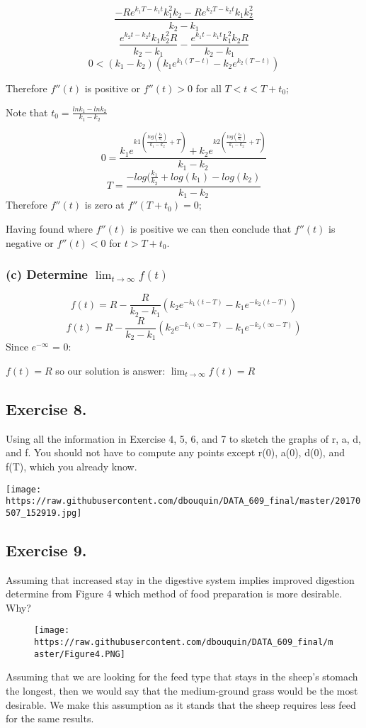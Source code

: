 \documentclass[]{article}
\begin{document}
\[\frac{-R e ^{k_1 T - k_1 t}k_1^2 k_2 - R e^{k_2T -k_2t}k_1 k_2^2}{k_2 - k_1}\]
\[\frac{ e^{k_2 t - k_2 t}k_1 k_2^2 R}{k_2 - k_1} - \frac{ e^{k_1 t - k_1 t}k_1^2 k_2 R}{k_2 - k_1}\]
\[0 < (k_1 - k_2)(k_1 e^{k_1(T-t)}- k_2 e^{k_2(T-t)})\]

Therefore \(f''(t)\) is positive or \(f''(t) > 0\) for all
\(T < t < T + t_0\);

Note that \(t_0 = \frac{ln k_1 - ln k_2}{k_1 - k_2}\)

\[0 = \frac{k_1 e^{k1(\frac{log(\frac{k_2}{k_1})}{k_1 - k_2}+T)} + k_2 e^{k2(\frac{log(\frac{k_2}{k_1})}{k_1 - k_2}+T)} }{k_1 - k_2}\]
\[T = \frac{-log(\frac{k_1}{k_2}+log(k_1)- log(k_2)}{k_1 - k_2}\]
Therefore \(f''(t)\) is zero at \(f''(T + t_0) =0\);

Having found where \(f''(t)\) is positive we can then conclude that
\(f''(t)\) is negative or \(f''(t) < 0\) for \(t > T + t_0\).

\subsubsection{\texorpdfstring{(c) Determine
\(\lim_{t\to\infty}f(t)\)}{(c) Determine \textbackslash{}lim\_\{t\textbackslash{}to\textbackslash{}infty\}f(t)}}\label{c-determine-lim_ttoinftyft}

\[f(t) = R - \frac{R}{k_2 - k_1}(k_2 e^{-k_1(t-T)}-k_1 e^{-k_2(t-T)})\]
\[f(t) = R - \frac{R}{k_2 - k_1}(k_2 e^{-k_1(\infty-T)}-k_1 e^{-k_2(\infty-T)})\]
Since \(e^{-\infty}\) = 0:

\(f(t) = R\) so our solution is answer: \(\lim_{t\to\infty}f(t) = R\)

\subsection{Exercise 8.}\label{exercise-8.}

Using all the information in Exercise 4, 5, 6, and 7 to sketch the
graphs of r, a, d, and f. You should not have to compute any points
except r(0), a(0), d(0), and f(T), which you already know.

\texttt{[image: https://raw.githubusercontent.com/dbouquin/DATA\_609\_final/master/20170507\_152919.jpg]}
\newpage

\subsection{Exercise 9.}\label{exercise-9.}

Assuming that increased stay in the digestive system implies improved
digestion determine from Figure 4 which method of food preparation is
more desirable. Why?

\begin{figure}
\centering
\texttt{[image: https://raw.githubusercontent.com/dbouquin/DATA\_609\_final/master/Figure4.PNG]}
\caption{}
\end{figure}

Assuming that we are looking for the feed type that stays in the sheep's
stomach the longest, then we would say that the medium-ground grass
would be the most desirable. We make this assumption as it stands that
the sheep requires less feed for the same results.
\end{document}
